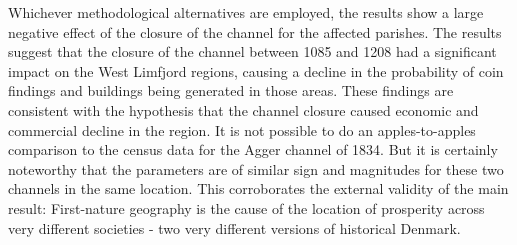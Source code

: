 \documentclass[11pt]{article}
\begin{document}
Whichever methodological alternatives are employed, the results show a large negative effect of the closure of the channel for the affected parishes. The results suggest that the closure of the channel between 1085 and 1208 had a significant impact on the West Limfjord regions, causing a decline in the probability of coin findings and buildings being generated in those areas. These findings are consistent with the hypothesis that the channel closure caused economic and commercial decline in the region. It is not possible to do an apples-to-apples comparison to the census data for the Agger channel of 1834. But it is certainly noteworthy that the parameters are of similar sign and magnitudes for these two channels in the same location. This corroborates the external validity of the main result: First-nature geography is the cause of the location of prosperity across very different societies - two very different versions of historical Denmark. 
\end{document}
